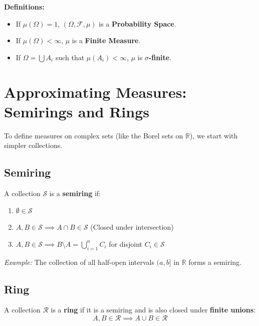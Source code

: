 \documentclass{article}
\begin{document}
\textbf{Definitions:}
\begin{itemize}
    \item If $\mu(\Omega) = 1$, $(\Omega, \mathscr{F}, \mu)$ is a \textbf{Probability Space}.
    \item If $\mu(\Omega) < \infty$, $\mu$ is a \textbf{Finite Measure}.
    \item If $\Omega = \bigcup A_i$ such that $\mu(A_i) < \infty$, $\mu$ is \textbf{$\sigma$-finite}.
\end{itemize}

\section{Approximating Measures: Semirings and Rings}
To define measures on complex sets (like the Borel sets on $\mathbb{R}$), we start with simpler collections.

\subsection{Semiring}
A collection $\mathcal{S}$ is a \textbf{semiring} if:
\begin{enumerate}
    \item $\emptyset \in \mathcal{S}$
    \item $A, B \in \mathcal{S} \implies A \cap B \in \mathcal{S}$ (Closed under intersection)
    \item $A, B \in \mathcal{S} \implies B \setminus A = \bigcup_{i=1}^n C_i$ for disjoint $C_i \in \mathcal{S}$
\end{enumerate}
\textit{Example:} The collection of all half-open intervals $(a, b]$ in $\mathbb{R}$ forms a semiring.

\subsection{Ring}
A collection $\mathcal{R}$ is a \textbf{ring} if it is a semiring and is also closed under \textbf{finite unions}:
\[ A, B \in \mathcal{R} \implies A \cup B \in \mathcal{R} \]
\end{document}
